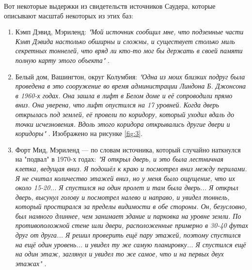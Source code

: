\documentclass[10pt,twocolumn,letterpaper]{article}
\begin{document}
Вот некоторые выдержки из свидетельств источников Саудера, которые описывают масштаб некоторых из этих баз:
\begin{flushleft}
\begin{enumerate}
    \item Кэмп Дэвид, Мэриленд: \textit{"Мой источник сообщил мне, что подземные части Кэмп Дэвида настолько обширны и сложны, и существует столько миль секретных тоннелей, что вряд ли кто-то мог бы держать в своей памяти полную карту этого объекта"} \cite{22}.
    \item Белый дом, Вашингтон, округ Колумбия: \textit{"Одна из моих близких подруг была проведена в это сооружение во время администрации Линдона Б. Джонсона в 1960-х годах. Она зашла в лифт в Белом доме и её сопроводили прямо вниз. Она уверена, что лифт опустился на 17 уровней. Когда дверь открылась под землей, её провели по коридору, который уходил вдаль до точки исчезновения. Вдоль этого коридора открывались другие двери и коридоры"} \cite{22}. Изображено на рисунке \ref{fig:3}.
    \item Форт Мид, Мэриленд — по словам источника, который случайно наткнулся на "подвал" в 1970-х годах: \textit{"Я открыл дверь, и это была лестничная клетка, ведущая вниз. Я подошёл к краю и посмотрел вниз между перилами. Я не считал количество этажей вниз, но у меня было ощущение, что их около 15-20... Я спустился на один пролет и там была дверь... Я открыл дверь, высунул голову и посмотрел налево и направо, и увидел тоннель, который простирался за пределы видимости в обе стороны. Он, безусловно, был намного длиннее, чем занимает здание и парковка на уровне земли. По противоположной стене шли двери, расположенные примерно в 30-40 футах друг от друга... Я решил проверить ещё пару этажей, поэтому спустился на ещё один уровень... и увидел ту же самую планировку... Я спустился ещё на один этаж, заглянул и увидел то же самое, что и на первых двух этажах"} \cite{22}.
\end{enumerate}
\end{flushleft}
\end{document}
